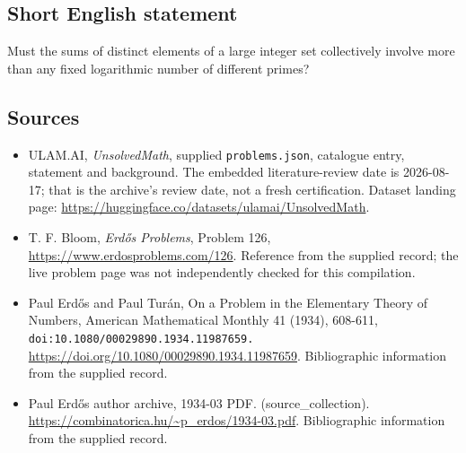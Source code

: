 \documentclass[11pt,a4paper]{article}
\begin{document}
\subsection{Short English statement}

Must the sums of distinct elements of a large integer set collectively involve more than any fixed logarithmic number of different primes?

\subsection{Sources}

{\small

\begin{itemize}

\item[\hypertarget{source:statement:1}{S1}] ULAM.AI, \emph{UnsolvedMath}, supplied \texttt{problems.json}, catalogue entry, statement and background. The embedded literature-review date is 2026-08-17; that is the archive’s review date, not a fresh certification. Dataset landing page: \url{https://huggingface.co/datasets/ulamai/UnsolvedMath}.

\item[\hypertarget{source:statement:2}{S2}] T. F. Bloom, \emph{Erdős Problems}, Problem 126, \url{https://www.erdosproblems.com/126}. Reference from the supplied record; the live problem page was not independently checked for this compilation.

\item[\hypertarget{source:statement:3}{S3}] Paul Erdős and Paul Turán, On a Problem in the Elementary Theory of Numbers, American Mathematical Monthly 41 (1934), 608-611, \nolinkurl{doi:10.1080/00029890.1934.11987659.} \url{https://doi.org/10.1080/00029890.1934.11987659}. Bibliographic information from the supplied record.

\item[\hypertarget{source:statement:4}{S4}] Paul Erdős author archive, 1934-03 PDF. (source\_collection). \url{https://combinatorica.hu/~p_erdos/1934-03.pdf}. Bibliographic information from the supplied record.

\end{itemize}

}

\label{end:statement}
\end{document}

